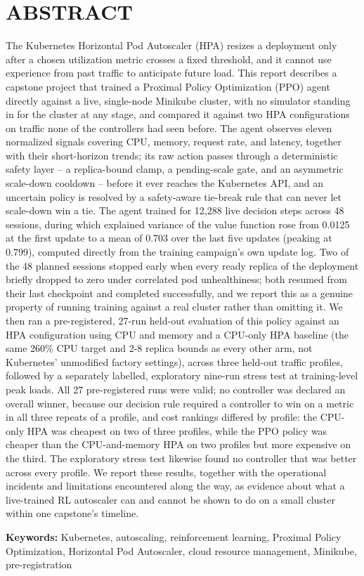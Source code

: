 \chapter*{\centering ABSTRACT}
\label{ch:abstract}

The Kubernetes Horizontal Pod Autoscaler (HPA) resizes a deployment only
after a chosen utilization metric crosses a fixed threshold, and it cannot
use experience from past traffic to anticipate future load. This report
describes a capstone project that trained a Proximal Policy Optimization
(PPO) agent directly against a live, single-node Minikube cluster, with no
simulator standing in for the cluster at any stage, and compared it against
two HPA configurations on traffic none of the controllers had seen before.
The agent observes eleven normalized signals covering CPU, memory, request
rate, and latency, together with their short-horizon trends; its raw action
passes through a deterministic safety layer -- a replica-bound clamp, a
pending-scale gate, and an asymmetric scale-down cooldown -- before it ever
reaches the Kubernetes API, and an uncertain policy is resolved by a
safety-aware tie-break rule that can never let scale-down win a tie. The
agent trained for 12,288 live decision steps across 48 sessions, during
which explained variance of the value function rose from 0.0125 at the
first update to a mean of 0.703 over the last five updates (peaking at
0.799), computed directly from the training campaign's own update log. Two
of the 48 planned sessions stopped early when every ready replica of the
deployment briefly dropped to zero under correlated pod unhealthiness; both
resumed from their last checkpoint and completed successfully, and we
report this as a genuine property of running training against a real
cluster rather than omitting it. We then ran a pre-registered, 27-run
held-out evaluation of this policy against an HPA configuration using CPU
and memory and a CPU-only HPA baseline (the same 260\% CPU target and 2-8
replica bounds as every other arm, not Kubernetes' unmodified factory
settings), across
three held-out traffic profiles, followed by a separately labelled,
exploratory nine-run stress test at training-level peak loads. All 27
pre-registered runs were valid; no controller was declared an overall
winner, because our decision rule required a controller to win on a metric
in all three repeats of a profile, and cost rankings differed by profile:
the CPU-only HPA was cheapest on two of three profiles, while the PPO
policy was cheaper than the CPU-and-memory HPA on two profiles but more
expensive on the third. The exploratory stress test likewise found no
controller that was better across every profile. We report these results,
together with the operational incidents and limitations encountered along
the way, as evidence about what a live-trained RL autoscaler can and cannot
be shown to do on a small cluster within one capstone's timeline.

\vspace{0.8cm}
\noindent \textbf{Keywords:} Kubernetes, autoscaling, reinforcement learning,
Proximal Policy Optimization, Horizontal Pod Autoscaler, cloud resource
management, Minikube, pre-registration
